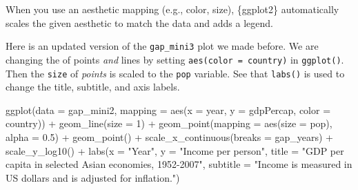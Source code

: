 \documentclass[
  letterpaper,
  DIV=11,
  numbers=noendperiod]{scrreprt}
\newenvironment{Shaded}{\begin{snugshade}}{\end{snugshade}}
\newcommand{\AttributeTok}[1]{\textcolor[rgb]{0.40,0.45,0.13}{#1}}
\newcommand{\DecValTok}[1]{\textcolor[rgb]{0.68,0.00,0.00}{#1}}
\newcommand{\FloatTok}[1]{\textcolor[rgb]{0.68,0.00,0.00}{#1}}
\newcommand{\FunctionTok}[1]{\textcolor[rgb]{0.28,0.35,0.67}{#1}}
\newcommand{\NormalTok}[1]{\textcolor[rgb]{0.00,0.23,0.31}{#1}}
\newcommand{\SpecialCharTok}[1]{\textcolor[rgb]{0.37,0.37,0.37}{#1}}
\newcommand{\StringTok}[1]{\textcolor[rgb]{0.13,0.47,0.30}{#1}}
\begin{document}
\begin{tcolorbox}[enhanced jigsaw, colframe=quarto-callout-note-color-frame, colbacktitle=quarto-callout-note-color!10!white, titlerule=0mm, opacitybacktitle=0.6, breakable, toprule=.15mm, arc=.35mm, rightrule=.15mm, colback=white, bottomrule=.15mm, opacityback=0, toptitle=1mm, left=2mm, bottomtitle=1mm, title=\textcolor{quarto-callout-note-color}{\faInfo}\hspace{0.5em}{Challenge}, leftrule=.75mm, coltitle=black]

When you use an aesthetic mapping (e.g., color, size), \{ggplot2\}
automatically scales the given aesthetic to match the data and adds a
legend.

Here is an updated version of the \texttt{gap\_mini3} plot we made
before. We are changing the of points \emph{and} lines by setting
\texttt{aes(color\ =\ country)} in \texttt{ggplot()}. Then the
\texttt{size} of \emph{points} is scaled to the \texttt{pop} variable.
See that \texttt{labs()} is used to change the title, subtitle, and axis
labels.

\begin{Shaded}
\begin{Highlighting}[]
\FunctionTok{ggplot}\NormalTok{(}\AttributeTok{data =}\NormalTok{ gap\_mini2, }
       \AttributeTok{mapping =} \FunctionTok{aes}\NormalTok{(}\AttributeTok{x =}\NormalTok{ year, }
                     \AttributeTok{y =}\NormalTok{ gdpPercap, }
                     \AttributeTok{color =}\NormalTok{ country)) }\SpecialCharTok{+}
  \FunctionTok{geom\_line}\NormalTok{(}\AttributeTok{size =} \DecValTok{1}\NormalTok{) }\SpecialCharTok{+}
  \FunctionTok{geom\_point}\NormalTok{(}\AttributeTok{mapping =} \FunctionTok{aes}\NormalTok{(}\AttributeTok{size =}\NormalTok{ pop),}
                           \AttributeTok{alpha =} \FloatTok{0.5}\NormalTok{) }\SpecialCharTok{+}
  \FunctionTok{geom\_point}\NormalTok{() }\SpecialCharTok{+}
  \FunctionTok{scale\_x\_continuous}\NormalTok{(}\AttributeTok{breaks =}\NormalTok{ gap\_years) }\SpecialCharTok{+}
  \FunctionTok{scale\_y\_log10}\NormalTok{()  }\SpecialCharTok{+}
  \FunctionTok{labs}\NormalTok{(}\AttributeTok{x =} \StringTok{"Year"}\NormalTok{, }
       \AttributeTok{y =} \StringTok{"Income per person"}\NormalTok{,}
       \AttributeTok{title =} \StringTok{"GDP per capita in selected Asian economies, 1952{-}2007"}\NormalTok{,}
       \AttributeTok{subtitle =} \StringTok{"Income is measured in US dollars and is adjusted for inflation."}\NormalTok{)}
\end{Highlighting}
\end{Shaded}


\end{tcolorbox}
\end{document}
